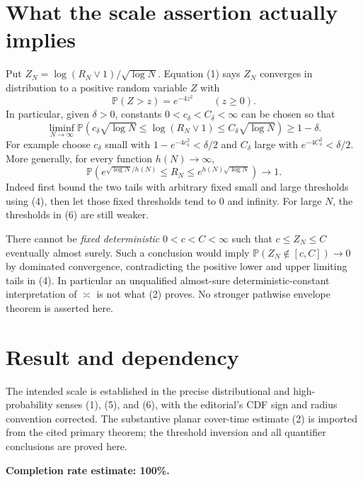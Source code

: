 \documentclass[11pt]{article}
\begin{document}
\section*{What the scale assertion actually implies}
Put $Z_N=\log(R_N\vee1)/\sqrt{\log N}$. Equation (1) says $Z_N$ converges in distribution to a positive random variable $Z$ with
\[
 \mathbb P(Z>z)=e^{-4z^2}\qquad(z\ge0).
\]
In particular, given $\delta>0$, constants $0<c_\delta<C_\delta<\infty$ can be chosen so that
\[
 \liminf_{N\to\infty}\mathbb P\left(
 c_\delta\sqrt{\log N}\le\log(R_N\vee1)\le C_\delta\sqrt{\log N}
 \right)\ge1-\delta.\tag{5}
\]
For example choose $c_\delta$ small with $1-e^{-4c_\delta^2}<\delta/2$ and $C_\delta$ large with $e^{-4C_\delta^2}<\delta/2$. More generally, for every function $h(N)\to\infty$,
\[
 \mathbb P\left(
 e^{\sqrt{\log N}/h(N)}\le R_N\le e^{h(N)\sqrt{\log N}}
 \right)\longrightarrow1.\tag{6}
\]
Indeed first bound the two tails with arbitrary fixed small and large thresholds using (4), then let those fixed thresholds tend to $0$ and infinity. For large $N$, the thresholds in (6) are still weaker.

There cannot be \emph{fixed deterministic} $0<c<C<\infty$ such that $c\le Z_N\le C$ eventually almost surely. Such a conclusion would imply $\mathbb P(Z_N\notin[c,C])\to0$ by dominated convergence, contradicting the positive lower and upper limiting tails in (4). In particular an unqualified almost-sure deterministic-constant interpretation of $\asymp$ is not what (2) proves. No stronger pathwise envelope theorem is asserted here.

\section*{Result and dependency}
The intended scale is established in the precise distributional and high-probability senses (1), (5), and (6), with the editorial's CDF sign and radius convention corrected. The substantive planar cover-time estimate (2) is imported from the cited primary theorem; the threshold inversion and all quantifier conclusions are proved here.

\textbf{Completion rate estimate: 100\%.}
\end{document}
